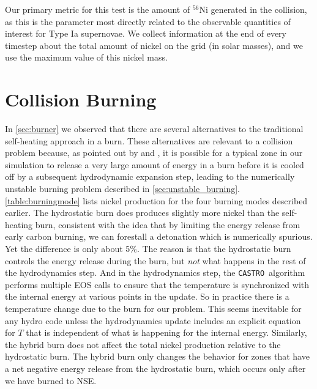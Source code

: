 \documentclass[twocolumn,numberedappendix]{../aastex6}
\newcommand{\castro}{\texttt{CASTRO}}
\begin{document}
Our primary metric for this test is the amount of $^{56}$Ni generated in the collision,
as this is the parameter most directly related to the observable quantities of interest
for Type Ia supernovae. We collect information at the end of every timestep about the
total amount of nickel on the grid (in solar masses), and we use the maximum value of
this nickel mass.



\section{Collision Burning}
\label{sec:collisionburning}


In \autoref{sec:burner} we observed that there are several alternatives to the traditional
self-heating approach in a burn. These alternatives are relevant to a collision problem because,
as pointed out by \cite{raskin:2010} and \cite{kushnir:2013}, it is possible for a typical
zone in our simulation to release a very large amount of energy in a burn before it is cooled
off by a subsequent hydrodynamic expansion step, leading to the numerically unstable burning
problem described in \autoref{sec:unstable_burning}. \autoref{table:burningmode} lists nickel
production for the four burning modes described earlier. The hydrostatic burn does produces
slightly more nickel than the self-heating burn, consistent with the idea that by limiting the
energy release from early carbon burning, we can forestall a detonation which is numerically
spurious. Yet the difference is only about 5\%. The reason is that the hydrostatic burn controls
the energy release during the burn, but \textit{not} what happens in the rest of the hydrodynamics
step. And in the hydrodynamics step, the \castro\ algorithm performs multiple EOS calls to ensure
that the temperature is synchronized with the internal energy at various points in the update.
So in practice there is a temperature change due to the burn for our problem. This seems inevitable
for any hydro code unless the hydrodynamics update includes an explicit equation for $T$ that is
independent of what is happening for the internal energy. Similarly, the hybrid burn does not
affect the total nickel production relative to the hydrostatic burn. The hybrid burn only changes
the behavior for zones that have a net negative energy release from the hydrostatic burn, which
occurs only after we have burned to NSE.
\end{document}
